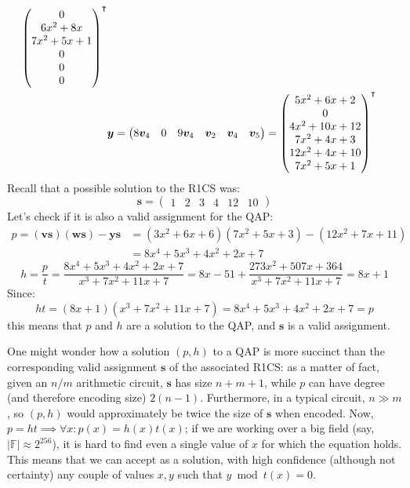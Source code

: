 \begin{example}
\begin{align*}
{\begin{pmatrix}
			   0             \\
			   6x^2 + 8x     \\
			   7x^2 + 5x + 1 \\
			   0             \\
			   0             \\
			   0
		   \end{pmatrix}}^\transpose                                                  \\
		 & \bm{y} =
		\begin{pmatrix}
			8\bm{v}_4 & 0 & 9\bm{v}_4 & \bm{v}_2 & \bm{v}_4 & \bm{v}_5
		\end{pmatrix}
		=
		{\begin{pmatrix}
			 5x^2 + 6x + 2   \\
			 0               \\
			 4x^2 + 10x + 12 \\
			 7x^2 + 4x + 3   \\
			 12x^2 + 4x + 10 \\
			 7x^2 + 5x + 1
		 \end{pmatrix}}^\transpose
	\end{align*}
	Recall that a possible solution to the R1CS was:
	\[\bm{s} = \begin{pmatrix} 1 & 2 & 3 & 4 & 12 & 10 \end{pmatrix}\]
	Let's check if it is also a valid assignment for the QAP\@:
	\begin{align*}
		p	    = \left(\bm{v}\bm{s}\right)\left(\bm{w}\bm{s}\right) - \bm{y}\bm{s}
		 & = \left(3x^2 + 6x + 6\right)\left(7x^2 + 5x + 3\right) - \left(12x^2 + 7x + 11\right) \\
		 & = 8x^4 + 5x^3 + 4x^2 + 2x + 7
	\end{align*}
	\[
		h = \frac{p}{t} = \frac{8x^4 + 5x^3 + 4x^2 + 2x + 7}{x^3 + 7x^2 + 11x + 7} =
		8x - 51 + \frac{273x^2 + 507x + 364}{x^3 + 7x^2 + 11x + 7} = 8x + 1
	\]
	Since:
	\[ht = \left(8x + 1\right)\left(x^3 + 7x^2 + 11x + 7\right) = 8x^4 + 5x^3 + 4x^2 + 2x + 7 = p\]
	this means that \(p\) and \(h\) are a solution to the QAP, and \(\bm{s}\) is a valid
	assignment.
\end{example}

\noindent One might wonder how a solution \(\left(p, h\right)\) to a QAP is more succinct than the
corresponding valid assignment \(\bm{s}\) of the associated R1CS\@: as a matter of fact, given an
\(n/m\) arithmetic circuit, \(\bm{s}\) has size \(n+m+1\), while \(p\) can have degree
(and therefore encoding size) \(2\left(n-1\right)\).
Furthermore, in a typical circuit, \(n \gg m\), so \(\left(p, h\right)\) would approximately be 
twice the size of \(\bm{s}\) when encoded.
Now, \(p = ht \implies \forall x\colon p\left(x\right) = h\left(x\right)t\left(x\right)\); 
if we are working over a big field (say, \(\left|\mathbb{F}\right| \approx 2^{256}\)), it is hard 
to find even a single value of \(x\) for which the equation holds.
This means that we can accept as a solution, with high confidence (although not certainty)
any couple of values \(x, y\) such that \(y \bmod t\left(x\right) = 0\).

